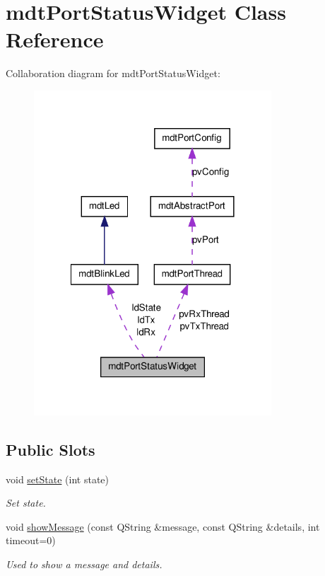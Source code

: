 \hypertarget{classmdt_port_status_widget}{
\section{mdtPortStatusWidget Class Reference}
\label{classmdt_port_status_widget}
}


Collaboration diagram for mdtPortStatusWidget:
\nopagebreak
\begin{figure}[H]
\begin{center}
\leavevmode
\includegraphics[width=252pt]{classmdt_port_status_widget__coll__graph}
\end{center}
\end{figure}
\subsection*{Public Slots}
\begin{DoxyCompactItemize}
\item 
void \hyperlink{classmdt_port_status_widget_a356064b89de5c7c8d1c8d5639d1d8f73}{setState} (int state)
\begin{DoxyCompactList}\small\item\em Set state. \end{DoxyCompactList}\item 
void \hyperlink{classmdt_port_status_widget_a8fce28ddb290512f5681cf800ac17b81}{showMessage} (const QString \&message, const QString \&details, int timeout=0)
\begin{DoxyCompactList}\small\item\em Used to show a message and details. \end{DoxyCompactList}\end{DoxyCompactItemize}
